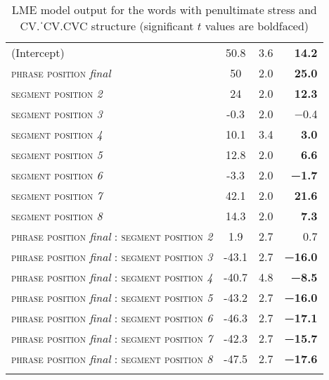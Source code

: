 \documentclass[output=paper]{langscibook}
\begin{document}
\begin{paperappendix}
\begin{table}[H]
    \caption{LME model output for the words with penultimate stress and CV.ˈCV.CVC structure (significant $t$ values are boldfaced)}
    \begin{tabular}{l S[table-format=-2.1] c r}
    \lsptoprule
      &  &  &    \\
    \midrule
    (Intercept) & 50.8 & 3.6   & \textbf{14.2} \\
    \textsc{phrase position} \textit{final} & 50 & 2.0 & \textbf{25.0} \\
    \textsc{segment position} \textit{2} & 24 & 2.0 & \textbf{12.3} \\
    \textsc{segment position} \textit{3} & -0.3 & 2.0 & −0.4 \\
    \textsc{segment position} \textit{4} & 10.1 & 3.4 & \textbf{3.0} \\
    \textsc{segment position} \textit{5} & 12.8 & 2.0 & \textbf{6.6} \\
    \textsc{segment position} \textit{6} & -3.3 & 2.0 & \textbf{−1.7} \\
    \textsc{segment position} \textit{7} & 42.1 & 2.0 & \textbf{21.6} \\
    \textsc{segment position} \textit{8} & 14.3 & 2.0 & \textbf{7.3} \\
    \textsc{phrase position} \textit{final} : \textsc{segment position} \textit{2} & 1.9 & 2.7 & 0.7 \\
    \textsc{phrase position} \textit{final} : \textsc{segment position} \textit{3} & -43.1 & 2.7 & \textbf{−16.0} \\
    \textsc{phrase position} \textit{final} : \textsc{segment position} \textit{4} & -40.7 & 4.8 & \textbf{−8.5} \\
    \textsc{phrase position} \textit{final} : \textsc{segment position} \textit{5} & -43.2 & 2.7 & \textbf{−16.0} \\
    \textsc{phrase position} \textit{final} : \textsc{segment position} \textit{6} & -46.3 & 2.7 & \textbf{−17.1} \\
    \textsc{phrase position} \textit{final} : \textsc{segment position} \textit{7} & -42.3 & 2.7 & \textbf{−15.7} \\
    \textsc{phrase position} \textit{final} : \textsc{segment position} \textit{8} & -47.5 & 2.7 & \textbf{−17.6} \\
    \lspbottomrule
    \end{tabular}
\end{table}

\end{paperappendix}

\printbibliography[heading=subbibliography,notkeyword=this]
\end{document}
